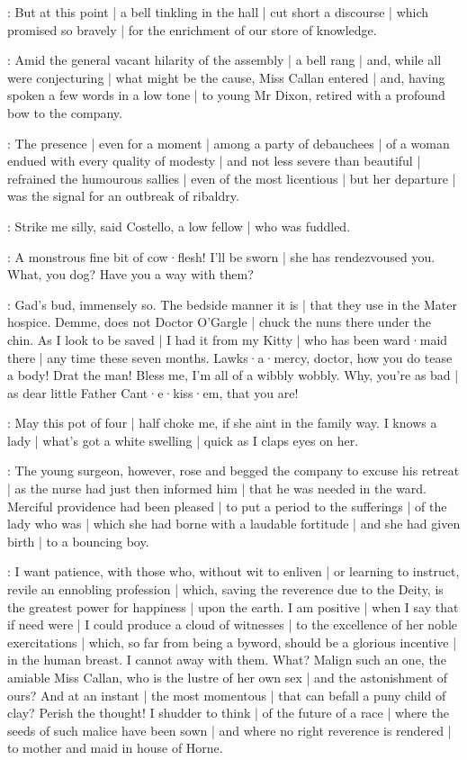 :
But at this point |
a bell tinkling in the hall |
cut short a discourse |
which promised so bravely |
for the enrichment of our store of knowledge.



:
Amid the general vacant hilarity of the assembly |
a bell rang |
and,
while all were conjecturing |
what might be the cause,
Miss Callan entered |
and,
having spoken a few words in a low tone |
to young Mr Dixon,
retired with a profound bow to the company.

:
The presence |
even for a moment |
among a party of debauchees |
of a woman endued with every quality of modesty |
and not less severe than beautiful |
refrained the humourous sallies |
even of the most licentious |
but her departure |
was the signal for an outbreak of ribaldry.

:
Strike me silly,
said Costello,
a low fellow |
who was fuddled.

\punch:
A monstrous fine bit of cow·flesh!
I'll be sworn |
she has rendezvoused you.
What,
you dog?
Have you a way with them?

\lynch:
Gad's bud,
immensely so.
The bedside manner it is |
that they use in the Mater hospice.
Demme,
does not Doctor O'Gargle |
chuck the nuns there under the chin.
As I look to be saved |
I had it from my Kitty |
who has been ward·maid there |
any time these seven months.
Lawks·a·mercy,
doctor,
how you do tease a body!
Drat the man!
Bless me,
I'm all of a wibbly
wobbly.
Why,
you're as bad |
as dear little Father Cant·e·kiss·em,
that you are!

\punch:
May this pot of four |
half choke me,
if she aint in the family way.
I knows a lady |
what's got a white swelling |
quick as I claps eyes on her.

:
The young surgeon,
however,
rose and begged the company to excuse his retreat |
as the nurse had just then informed him |
that he was needed in the ward.
Merciful providence had been pleased |
to put a period to the sufferings |
of the lady who was  |
which she had borne with a laudable fortitude |
and she had given birth |
to a bouncing boy.

\dixon:
I want patience,
with those who,
without wit to enliven |
or learning to instruct,
revile an ennobling profession |
which,
saving the reverence due to the Deity,
is the greatest power for happiness |
upon the earth.
I am positive |
when I say that if need were |
I could produce a cloud of witnesses |
to the excellence of her noble exercitations |
which,
so far from being a byword,
should be a glorious incentive |
in the human breast.
I cannot away with them.
What?
Malign such an one,
the amiable Miss Callan,
who is the lustre of her own sex |
and the astonishment of ours?
And at an instant |
the most momentous |
that can befall a puny child of clay?
Perish the thought!
I shudder to think |
of the future of a race |
where the seeds of such malice have been sown |
and where no right reverence is rendered |
to mother and maid in house of Horne.

